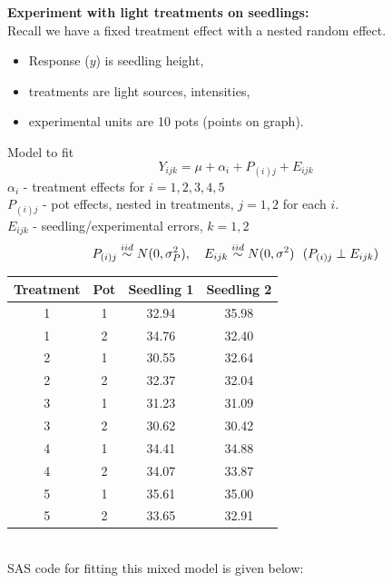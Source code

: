 \newpage

\textbf{Experiment with light treatments on seedlings:}\\
Recall we have a fixed treatment effect with a nested random effect.  
\begin{itemize}
\item Response ($y$) is seedling height, 
\item treatments are light sources, intensities,
\item experimental units are 10 pots (points on graph).
\end{itemize}
Model to fit
$$ Y_{ijk} = \mu + \alpha_i + P_{(i)j} + E_{ijk} $$
$\alpha_i$ - treatment effects for $i=1,2,3,4,5$ \\
$P_{(i)j}$ - pot effects, nested in treatments, $j=1,2$ for each $i$. \\
$E_{ijk}$ -  seedling/experimental errors, $k=1,2$
$$P_{(i)j} \iid N(0,\sigma_P^2), \ \ \ E_{ijk} \iid N(0,\sigma^2) \ \ (P_{(i)j} \perp E_{ijk})$$

\begin{small}
\begin{center}
\begin{tabular}{cc|cc}
Treatment & Pot & Seedling 1 & Seedling 2 \\ \hline
1          &       1       &      32.94      &      35.98 \\
1          &       2       &      34.76      &      32.40 \\
2          &       1       &      30.55      &      32.64 \\
2          &       2       &      32.37      &      32.04 \\
3          &       1       &      31.23      &      31.09 \\
3          &       2       &      30.62      &      30.42 \\
4          &       1       &      34.41      &      34.88 \\
4          &       2       &      34.07      &      33.87 \\
5          &       1       &      35.61      &      35.00 \\
5          &       2       &      33.65      &      32.91 \\ \hline
\end{tabular}
\end{center}
\end{small}
~\\
SAS code for fitting this mixed model is given below:\\
	
